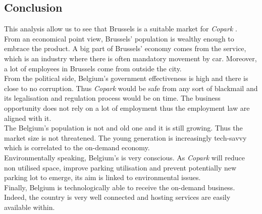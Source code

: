 \documentclass[12pt,a4paper,oneside]{book}
\newcommand{\bp}{\textit{Copark }}
\begin{document}
\subsection{Conclusion}
This analysis allow us to see that Brussels is a suitable market for \bp.\\
From an economical point view, Brussels' population is wealthy enough to embrace the product. A big part of Brussels' economy comes from the service, which is an industry where there is often mandatory movement by car. Moreover, a lot of employees in Brussels come from outside the city.\\
From the political side, Belgium's government effectiveness is high and there is close to no corruption. Thus \bp would be safe from any sort of blackmail and its legalisation and regulation process would be on time. The business opportunity does not rely on a lot of employment thus the employment law are aligned with it.\\
The Belgium's population is not and old one and it is still growing. Thus the market size is not threatened. The young generation is increasingly tech-savvy which is correlated to the on-demand economy.\\
Environmentally speaking, Belgium's is very conscious. As \bp will reduce non utilised space, improve parking utilisation and prevent potentially new parking lot to emerge, its aim is linked to environmental issues.\\
Finally, Belgium is technologically able to receive the on-demand business. Indeed, the country is very well connected and hosting services are easily available within.
\end{document}
